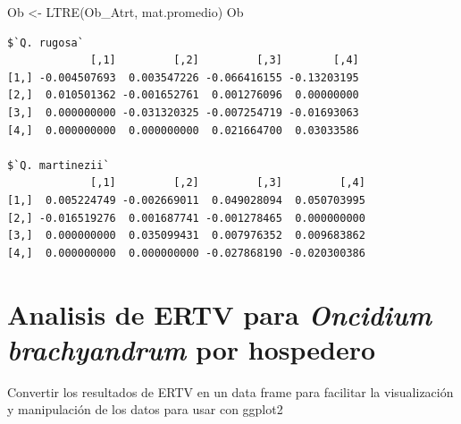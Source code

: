 \documentclass[
  12pt,
  letterpaper,
]{book}
\newenvironment{Shaded}{\begin{snugshade}}{\end{snugshade}}
\newcommand{\FunctionTok}[1]{\textcolor[rgb]{0.28,0.35,0.67}{#1}}
\newcommand{\NormalTok}[1]{\textcolor[rgb]{0.00,0.23,0.31}{#1}}
\newcommand{\OtherTok}[1]{\textcolor[rgb]{0.00,0.23,0.31}{#1}}
\begin{document}
\begin{Shaded}
\begin{Highlighting}[]
\NormalTok{Ob }\OtherTok{\textless{}{-}} \FunctionTok{LTRE}\NormalTok{(Ob\_Atrt, mat.promedio)}
\NormalTok{Ob}
\end{Highlighting}
\end{Shaded}

\begin{verbatim}
$`Q. rugosa`
             [,1]         [,2]         [,3]        [,4]
[1,] -0.004507693  0.003547226 -0.066416155 -0.13203195
[2,]  0.010501362 -0.001652761  0.001276096  0.00000000
[3,]  0.000000000 -0.031320325 -0.007254719 -0.01693063
[4,]  0.000000000  0.000000000  0.021664700  0.03033586

$`Q. martinezii`
             [,1]         [,2]         [,3]         [,4]
[1,]  0.005224749 -0.002669011  0.049028094  0.050703995
[2,] -0.016519276  0.001687741 -0.001278465  0.000000000
[3,]  0.000000000  0.035099431  0.007976352  0.009683862
[4,]  0.000000000  0.000000000 -0.027868190 -0.020300386
\end{verbatim}

\section{\texorpdfstring{Analisis de ERTV para \emph{Oncidium
brachyandrum} por
hospedero}{Analisis de ERTV para Oncidium brachyandrum por hospedero}}\label{analisis-de-ertv-para-oncidium-brachyandrum-por-hospedero}

Convertir los resultados de ERTV en un data frame para facilitar la
visualización y manipulación de los datos para usar con ggplot2
\end{document}
